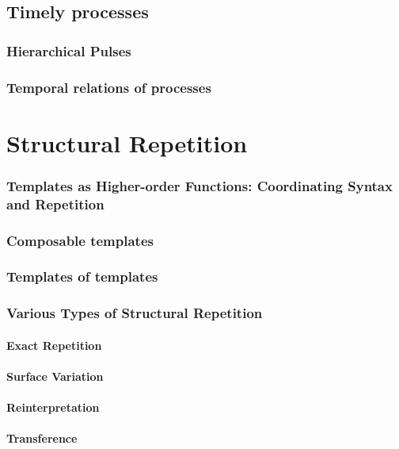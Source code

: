 \chapter{Timely processes}
    \section{Hierarchical Pulses}
    \section{Temporal relations of processes}
    \section{}

\part{Structural Repetition}
    \section{Templates as Higher-order Functions: Coordinating Syntax and Repetition}
        \section{Composable templates}
        \section{Templates of templates}
    \section{Various Types of Structural Repetition}
        \subsection{Exact Repetition}
        \subsection{Surface Variation}
        \subsection{Reinterpretation}
        \subsection{Transference}
